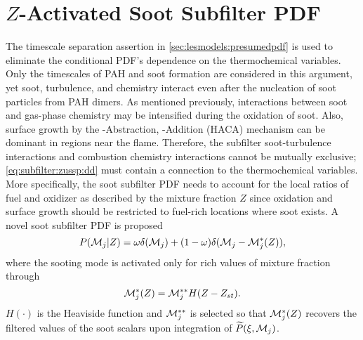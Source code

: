 \section{\texorpdfstring{$Z$}{Z}-Activated Soot Subfilter PDF}
\label{sec:subfilter:zassp}

The timescale separation assertion in \cref{sec:lesmodels:presumedpdf} is used to eliminate the conditional PDF's dependence on the thermochemical variables. Only the timescales of PAH and soot formation are considered in this argument, yet soot, turbulence, and chemistry interact even after the nucleation of soot particles from PAH dimers. As mentioned previously, interactions between soot and gas-phase chemistry may be intensified during the oxidation of soot. Also, surface growth by the -Abstraction, -Addition (HACA) mechanism can be dominant in regions near the flame. Therefore, the subfilter soot-turbulence interactions and combustion chemistry interactions cannot be mutually exclusive; \cref{eq:subfilter:zussp:dd} must contain a connection to the thermochemical variables. More specifically, the soot subfilter PDF needs to account for the local ratios of fuel and oxidizer as described by the mixture fraction $Z$ since oxidation and surface growth should be restricted to fuel-rich locations where soot exists. A novel soot subfilter PDF is proposed
\begin{equation}\label{eq:subfilter:zassp:dd}
  P(\mathcal{M}_j|Z) = \omega\delta(\mathcal{M}_j) + (1 - \omega)\delta(\mathcal{M}_j - \mathcal{M}_j^*(Z)),
\end{equation}
where the sooting mode is activated only for rich values of mixture fraction through
\begin{equation}\label{eq:subfilter:zassp:mstar}
  \mathcal{M}_j^*(Z) = \mathcal{M}_j^{**}H(Z - Z_{st}).
\end{equation}
$H(\cdot)$ is the Heaviside function and $\mathcal{M}_j^{**}$ is selected so that $\mathcal{M}_j^*(Z)$ recovers the filtered values of the soot scalars upon integration of $\widetilde{P}(\xi,\mathcal{M}_j)$.

